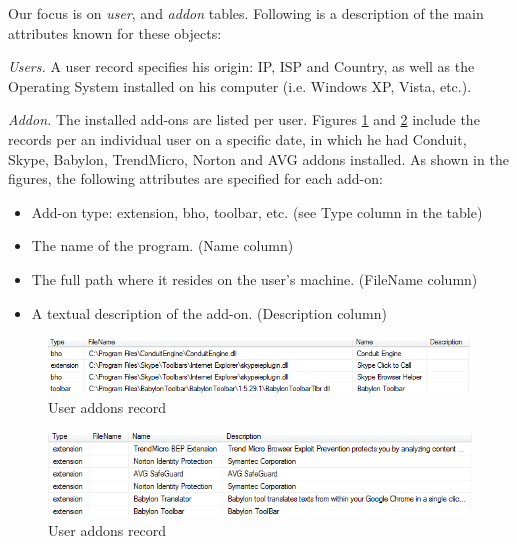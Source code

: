 \documentclass[11pt,oneside]{book}
\begin{document}
Our focus is on {\it user}, and {\it addon} tables. Following is a description of the main attributes known for these objects:

{\it Users.} A user record specifies his origin: IP, ISP and Country, as well as the Operating System installed on his computer (i.e. Windows XP, Vista, etc.).

{\it Addon.} The installed add-ons are listed per user. Figures \ref{fig:db_addons_snapshot} and \ref{fig:db_addons_snapshot_desc} include the records per an individual user on a specific date, in which he had Conduit, Skype, Babylon, TrendMicro, Norton and AVG addons installed. As shown in the figures, the following attributes are specified for each add-on:
\begin{itemize}
\item Add-on type: extension, bho, toolbar, etc. (see Type column in the table)
\item The name of the program. (Name column)
\item The full path where it resides on the user's machine. (FileName column)
\item A textual description of the add-on. (Description column)
\end{itemize}

\begin{figure}[t]
\centering
\begin{small}
\includegraphics[scale=.8,angle=0]{figures/db_addons_snapshot.png}
\end{small}
\caption{User addons record}
\label{fig:db_addons_snapshot}
\end{figure}

\begin{figure}[t]
\centering
\begin{small}
\includegraphics[scale=.8,angle=0]{figures/db_addons_snapshot_desc.png}
\end{small}
\caption{User addons record}
\label{fig:db_addons_snapshot_desc}
\end{figure}
\end{document}
